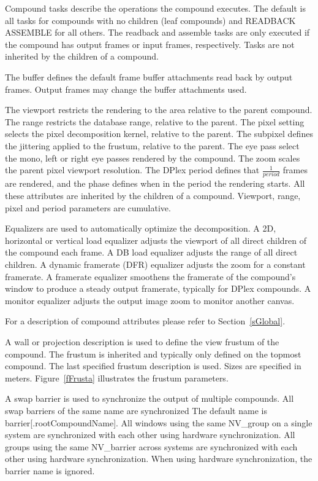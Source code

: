 \documentclass[10pt,a4]{scrartcl}
\newcommand{\fig}[1]{Figure~\ref{#1}}
\newcommand{\sref}[1]{Section~\ref{#1}}
\begin{document}
Compound tasks describe the operations the compound executes. The
default is all tasks for compounds with no children (leaf compounds) and
\textsf{READBACK ASSEMBLE} for all others. The readback and assemble
tasks are only executed if the compound has output frames or input
frames, respectively. Tasks are not inherited by the children of a
compound.

The buffer defines the default frame buffer attachments read back by
output frames. Output frames may change the buffer attachments used.

The viewport restricts the rendering to the area relative to the parent
compound. The range restricts the database range, relative to the
parent. The pixel setting selects the pixel decomposition kernel,
relative to the parent. The subpixel defines the jittering applied to
the frustum, relative to the parent. The eye pass select the mono, left
or right eye passes rendered by the compound. The zoom scales the parent
pixel viewport resolution. The DPlex period defines that $\frac{1}{period}$
frames are rendered, and the phase defines when in the period the
rendering starts. All these attributes are inherited by the children of
a compound. Viewport, range, pixel and period parameters are cumulative.

Equalizers are used to automatically optimize the decomposition. A 2D,
horizontal or vertical load equalizer adjusts the viewport of all direct
children of the compound each frame. A DB load equalizer adjusts the
range of all direct children. A dynamic framerate (DFR) equalizer adjusts
the zoom for a constant framerate. A framerate equalizer
smoothens the framerate of the compound's window to produce a steady
output framerate, typically for DPlex compounds. A monitor equalizer
adjusts the output image zoom to monitor another canvas.

For a description of compound attributes please refer to \sref{sGlobal}.

A wall or projection description is used to define the view frustum of
the compound. The frustum is inherited and typically only defined on the
topmost compound. The last specified frustum description is used. Sizes
are specified in meters. \fig{fFrusta} illustrates the frustum
parameters.

A swap barrier is used to synchronize the output of multiple
compounds. All swap barriers of the same name are synchronized The
default name is \textsf{barrier[.root\-Com\-pound\-Name]}. All windows
using the same \textsf{NV\_group} on a single system are synchronized
with each other using hardware synchronization. All groups using the
same \textsf{NV\_barrier} across systems are synchronized with each
other using hardware synchronization. When using hardware
synchronization, the barrier name is ignored.
\end{document}
